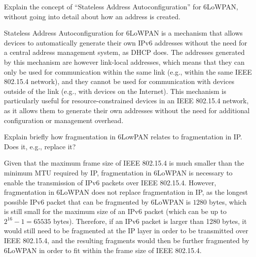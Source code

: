 \begin{ejercicio}
    Explain the concept of ``Stateless Address Autoconfiguration'' for 6LoWPAN, without going into detail about how an address is created.

    Stateless Address Autoconfiguration for 6LoWPAN is a mechanism that allows devices to automatically generate their own IPv6 addresses without the need for a central address management system, as DHCP does. The addresses generated by this mechanism are however link-local addresses, which means that they can only be used for communication within the same link (e.g., within the same IEEE 802.15.4 network), and they cannot be used for communication with devices outside of the link (e.g., with devices on the Internet). This mechanism is particularly useful for resource-constrained devices in an IEEE 802.15.4 network, as it allows them to generate their own addresses without the need for additional configuration or management overhead.
\end{ejercicio}

\begin{ejercicio}
    Explain briefly how fragmentation in 6LowPAN relates to fragmentation in IP. Does it, e.g., replace it?

    Given that the maximum frame size of IEEE 802.15.4 is much smaller than the minimum MTU required by IP, fragmentation in 6LoWPAN is necessary to enable the transmission of IPv6 packets over IEEE 802.15.4. However, fragmentation in 6LoWPAN does not replace fragmentation in IP, as the longest possible IPv6 packet that can be fragmented by 6LoWPAN is $1280$ bytes, which is still small for the maximum size of an IPv6 packet (which can be up to $2^{16}-1 = 65535$ bytes). Therefore, if an IPv6 packet is larger than 1280 bytes, it would still need to be fragmented at the IP layer in order to be transmitted over IEEE 802.15.4, and the resulting fragments would then be further fragmented by 6LoWPAN in order to fit within the frame size of IEEE 802.15.4.
\end{ejercicio}

